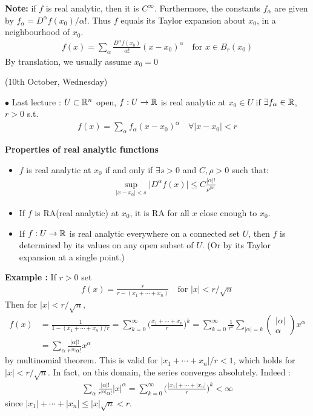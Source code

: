 \documentclass[10pt,a4paper]{report}
\begin{document}
\textbf{Note:} if $f$ is real analytic, then it is $C^{\infty}$. Furthermore, the constants $f_{\alpha}$ are given by $f_{\alpha} = D^{\alpha}f(x_0) /\alpha!$. Thus $f$ equals its Taylor expansion about $x_0$, in a neighbourhood of $x_0$.
\begin{align*}
f(x) = \sum_{\alpha} \frac{D^{\alpha}f(x_0)}{\alpha!} (x-x_0)^{\alpha} \quad \text{for } x \in B_r(x_0)
\end{align*}
By translation, we usually assume $x_0 =0$
\s

\newday

(10th October, Wednesday)
\s

$\bullet$ Last lecture : $U \subset \mathbb{R}^n$ open, $f: U \rightarrow \mathbb{R}$ is real analytic at $x_0 \in U$ if $\exists f_{\alpha} \in \mathbb{R}$, $r>0$ s.t.
\begin{align*}
f(x)  = \sum_{\alpha} f_{\alpha}(x-x_0)^{\alpha} \quad \forall |x-x_0|<r
\end{align*}
\s

\textbf{Properties of real analytic functions}
\begin{itemize}
\item $f$ is real analytic at $x_0$ if and only if $\exists s>0$ and $C,\rho>0$ such that:
\begin{align*}
\sup_{|x-x_0|< s}\big| D^{\alpha}f(x) \big| \leq C \frac{|\alpha|!}{\rho^{|\alpha|}}
\end{align*}
\item If $f$ is RA(real analytic) at $x_0$, it is RA for all $x$ close enough to $x_0$.
\item If $f: U \rightarrow \mathbb{R}$ is real analytic everywhere on a connected set $U$, then $f$ is determined by its values on any open subset of $U$. (Or by its Taylor expansion at a single point.)
\end{itemize}
\s

\textbf{Example :} If $r>0$ set
\begin{align*}
f(x) = \frac{r}{r-(x_1 + \cdots + x_n)} \quad \text{for } |x|<r/\sqrt{n}
\end{align*}
Then for $|x| < r/\sqrt{n}$,
\begin{align*}
f(x) &= \frac{1}{1-(x_1 + \cdots +x_n)/r} = \sum_{k=0}^{\infty} \Big( \frac{x_1 +\cdots +x_n}{r} \Big)^k = \sum_{k=0}^{\infty} \frac{1}{r^k} \sum_{|\alpha| = k} \begin{pmatrix}
|\alpha| \\
\alpha
\end{pmatrix} x^{\alpha} \\
& =  \sum_{\alpha} \frac{|\alpha|!}{r^{|\alpha|}\alpha!} x^{\alpha}
\end{align*}
by multinomial theorem. This is valid for $|x_1+\cdots +x_n|/r <1$, which holds for $|x|<r/\sqrt{n}$. In fact, on this domain, the series converges absolutely. Indeed :
\begin{align*}
\sum_{\alpha} \frac{|\alpha|!}{r^{|\alpha|}\alpha!} |x|^{\alpha} = \sum_{k=0}^{\infty} \Big( \frac{|x_1|+\cdots+|x_n|}{r} \Big)^k < \infty
\end{align*}
since $|x_1|+\cdots +|x_n| \leq |x| \sqrt{n} <r$.
\s
\end{document}
